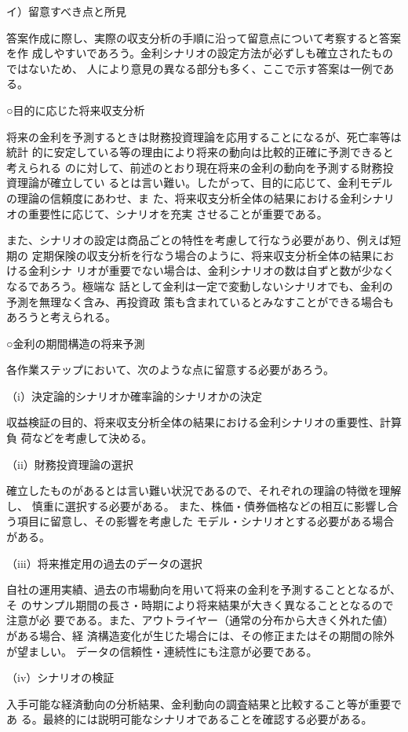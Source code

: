 \documentclass[report,gutter=10mm,fore-edge=10mm,uplatex,dvipdfmx]{jlreq}
\begin{document}
イ）留意すべき点と所見

答案作成に際し、実際の収支分析の手順に沿って留意点について考察すると答案を作
成しやすいであろう。金利シナリオの設定方法が必ずしも確立されたものではないため、
人により意見の異なる部分も多く、ここで示す答案は一例である。

○目的に応じた将来収支分析

将来の金利を予測するときは財務投資理論を応用することになるが、死亡率等は統計
的に安定している等の理由により将来の動向は比較的正確に予測できると考えられる
のに対して、前述のとおり現在将来の金利の動向を予測する財務投資理論が確立してい
るとは言い難い。したがって、目的に応じて、金利モデルの理論の信頼度にあわせ、ま
た、将来収支分析全体の結果における金利シナリオの重要性に応じて、シナリオを充実
させることが重要である。

また、シナリオの設定は商品ごとの特性を考慮して行なう必要があり、例えば短期の
定期保険の収支分析を行なう場合のように、将来収支分析全体の結果における金利シナ
リオが重要でない場合は、金利シナリオの数は自ずと数が少なくなるであろう。極端な
話として金利は一定で変動しないシナリオでも、金利の予測を無理なく含み、再投資政
策も含まれているとみなすことができる場合もあろうと考えられる。

○金利の期間構造の将来予測

各作業ステップにおいて、次のような点に留意する必要があろう。

（i）決定論的シナリオか確率論的シナリオかの決定

収益検証の目的、将来収支分析全体の結果における金利シナリオの重要性、計算負
荷などを考慮して決める。

（ii）財務投資理論の選択

確立したものがあるとは言い難い状況であるので、それぞれの理論の特徴を理解し、
慎重に選択する必要がある。
また、株価・債券価格などの相互に影響し合う項目に留意し、その影響を考慮した
モデル・シナリオとする必要がある場合がある。

（iii）将来推定用の過去のデータの選択

自社の運用実績、過去の市場動向を用いて将来の金利を予測することとなるが、そ
のサンプル期間の長さ・時期により将来結果が大きく異なることとなるので注意が必
要である。また、アウトライヤー（通常の分布から大きく外れた値）がある場合、経
済構造変化が生じた場合には、その修正またはその期間の除外が望ましい。
データの信頼性・連続性にも注意が必要である。

（iv）シナリオの検証

入手可能な経済動向の分析結果、金利動向の調査結果と比較すること等が重要であ
る。最終的には説明可能なシナリオであることを確認する必要がある。
\end{document}
